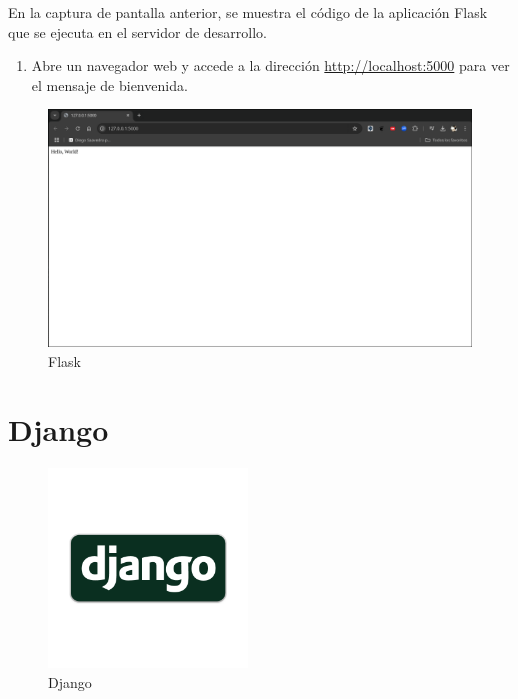 \documentclass[
  a4paper,
  DIV=11,
  numbers=noendperiod,
  onepage,
  openany]{scrreprt}
\providecommand{\tightlist}{%
  \setlength{\itemsep}{0pt}\setlength{\parskip}{0pt}}\usepackage{longtable,booktabs,array}
\begin{document}
En la captura de pantalla anterior, se muestra el código de la
aplicación Flask que se ejecuta en el servidor de desarrollo.

\begin{enumerate}
\def\labelenumi{\arabic{enumi}.}
\setcounter{enumi}{3}
\tightlist
\item
  Abre un navegador web y accede a la dirección
  \url{http://localhost:5000} para ver el mensaje de bienvenida.
\end{enumerate}

\begin{figure}[H]

{\centering \includegraphics[width=8.33333in,height=\textheight,keepaspectratio]{unidades/unidad7/./images/flask_code002.png}

}

\caption{Flask}

\end{figure}%

\section{Django}\label{django}

\begin{figure}[H]

{\centering \includegraphics[width=2.08333in,height=\textheight,keepaspectratio]{unidades/unidad7/./images/django_logo.png}

}

\caption{Django}

\end{figure}%
\end{document}
